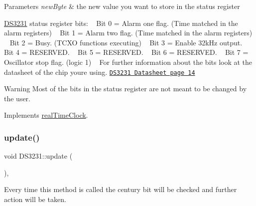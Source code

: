 \begin{DoxyParams}{Parameters}
{\em new\+Byte} & the new value you want to store in the status register\\
\hline
\end{DoxyParams}
\mbox{\hyperlink{class_d_s3231}{D\+S3231}} status register bits\+: ~\newline
 Bit 0 = Alarm one flag. (Time matched in the alarm registers) ~\newline
 Bit 1 = Alarm two flag. (Time matched in the alarm registers) ~\newline
 Bit 2 = Busy. (T\+C\+XO functions executing) ~\newline
 Bit 3 = Enable 32k\+Hz output. ~\newline
 Bit 4 = R\+E\+S\+E\+R\+V\+ED. ~\newline
 Bit 5 = R\+E\+S\+E\+R\+V\+ED. ~\newline
 Bit 6 = R\+E\+S\+E\+R\+V\+ED. ~\newline
 Bit 7 = Oscillator stop flag. (logic 1) ~\newline
 For further information about the bits look at the datasheet of the chip you\textquotesingle{}re using. \href{https://datasheets.maximintegrated.com/en/ds/DS3231.pdf}{\tt D\+S3231 Datasheet page 14} \begin{DoxyWarning}{Warning}
Most of the bits in the status register are not meant to be changed by the user. 
\end{DoxyWarning}


Implements \mbox{\hyperlink{classreal_time_clock_aa8ee80a7056c67543834508d0f04a218}{real\+Time\+Clock}}.

\mbox{\label{class_d_s3231_a143ec57122d892ea0ec671a153352f2c}} 
\subsubsection{\texorpdfstring{update()}{update()}}
{\footnotesize\ttfamily void D\+S3231\+::update (\begin{DoxyParamCaption}{ }\end{DoxyParamCaption})\hspace{0.3cm}{\ttfamily [override]}, {\ttfamily [virtual]}}



Every time this method is called the century bit will be checked and further action will be taken. 

